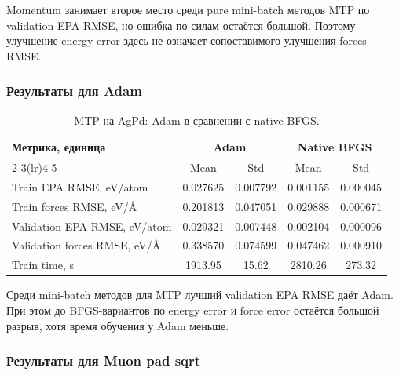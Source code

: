 
Momentum занимает второе место среди pure mini-batch методов MTP по validation EPA RMSE, но ошибка по силам остаётся большой. Поэтому улучшение energy error здесь не означает сопоставимого улучшения forces RMSE.

\FloatBarrier

\subsubsection{Результаты для Adam}

\begin{table}[H]
\centering
\small
\caption{MTP на AgPd: Adam в сравнении с native BFGS.}
\label{tab:mtp-adam}
\begin{tabular}{lcccc}
\toprule
\multirow{2}{*}{Метрика, единица} & \multicolumn{2}{c}{Adam} & \multicolumn{2}{c}{Native BFGS} \\
\cmidrule(lr){2-3}\cmidrule(lr){4-5}
 & Mean & Std & Mean & Std \\
\midrule
Train EPA RMSE, eV/atom & 0.027625 & 0.007792 & 0.001155 & 0.000045 \\
Train forces RMSE, eV/\AA & 0.201813 & 0.047051 & 0.029888 & 0.000671 \\
Validation EPA RMSE, eV/atom & 0.029321 & 0.007448 & 0.002104 & 0.000096 \\
Validation forces RMSE, eV/\AA & 0.338570 & 0.074599 & 0.047462 & 0.000910 \\
Train time, s & 1913.95 & 15.62 & 2810.26 & 273.32 \\
\bottomrule
\end{tabular}
\end{table}


Среди mini-batch методов для MTP лучший validation EPA RMSE даёт Adam. При этом до BFGS-вариантов по energy error и force error остаётся большой разрыв, хотя время обучения у Adam меньше.

\FloatBarrier

\subsubsection{Результаты для Muon pad sqrt}

